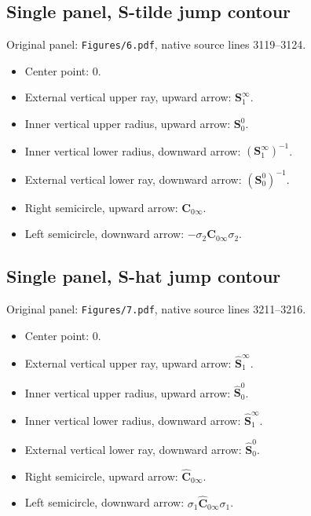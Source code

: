 \documentclass[11pt]{article}
\numberwithin{equation}{section}
\numberwithin{equation}{section}
\begin{document}
\subsection*{Single panel, S-tilde jump contour}
\noindent Original panel: \texttt{Figures/6.pdf}, native source lines 3119--3124.
\begin{itemize}\itemsep=0pt
\item Center point: $0$.
\item External vertical upper ray, upward arrow: $\mathbf{S}_1^\infty{}$.
\item Inner vertical upper radius, upward arrow: $\mathbf{S}_0^0{}$.
\item Inner vertical lower radius, downward arrow: $(\mathbf{S}_1^\infty{})^{-1}$.
\item External vertical lower ray, downward arrow: $(\mathbf{S}_0^0{})^{-1}$.
\item Right semicircle, upward arrow: $\mathbf{C}_{0\infty}{}$.
\item Left semicircle, downward arrow: $-\sigma_2\mathbf{C}_{0\infty}{}\sigma_2$.
\end{itemize}

\subsection*{Single panel, S-hat jump contour}
\noindent Original panel: \texttt{Figures/7.pdf}, native source lines 3211--3216.
\begin{itemize}\itemsep=0pt
\item Center point: $0$.
\item External vertical upper ray, upward arrow: $\widehat{\mathbf{S}}_1^\infty$.
\item Inner vertical upper radius, upward arrow: $\widehat{\mathbf{S}}_0^0$.
\item Inner vertical lower radius, downward arrow: $\widehat{\mathbf{S}}_1^\infty$.
\item External vertical lower ray, downward arrow: $\widehat{\mathbf{S}}_0^0$.
\item Right semicircle, upward arrow: $\widehat{\mathbf{C}}_{0\infty}$.
\item Left semicircle, downward arrow: $\sigma_1\widehat{\mathbf{C}}_{0\infty}\sigma_1$.
\end{itemize}
\end{document}
